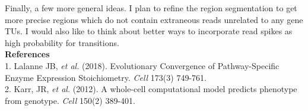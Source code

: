 \documentclass[11pt]{article}
\begin{document}
Finally, a few more general ideas.  I plan to refine the region segmentation to get more precise regions which do not contain extraneous reads unrelated to any gene TUs. I would also like to think about better ways to incorporate read spikes as high probability for transitions. \\

\textbf{\footnotesize References} \vspace{1pt} \\
{\footnotesize
1. Lalanne JB, \textit{et al.} (2018). Evolutionary Convergence of Pathway-Specific Enzyme Expression Stoichiometry. \textit{Cell} 173(3) 749-761. \\
2. Karr, JR, \textit{et al.} (2012). A whole-cell computational model predicts phenotype from genotype. \textit{Cell} 150(2) 389-401.
}
\end{document}

